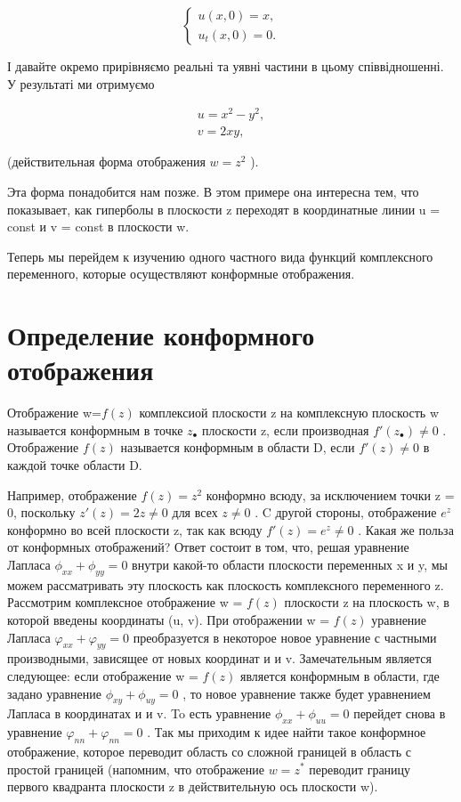 \documentclass[
  ukrainian,
]{article}
\begin{document}
\[
\begin{cases} u(x, 0) = x, \\ u_t(x, 0) = 0. \end{cases}
\]

І давайте окремо прирівняємо реальні та уявні частини в цьому
співвідношенні. У результаті ми отримуємо

\[
\begin{array}{ll} u=x^2-y^2,\\ v=2xy, \end{array}
\]

(действительная форма отображения \(w=z^2\) ).

Эта форма понадобится нам позже. В этом примере она интересна тем, что
показывает, как гиперболы в плоскости z переходят в координатные линии u
= const и v = const в плоскости w.

Теперь мы перейдем к изучению одного частного вида функций комплексного
переменного, которые осуществляют конформные отображения.

\section{Определение конформного
отображения}\label{ux43eux43fux440ux435ux434ux435ux43bux435ux43dux438ux435-ux43aux43eux43dux444ux43eux440ux43cux43dux43eux433ux43e-ux43eux442ux43eux431ux440ux430ux436ux435ux43dux438ux44f}

Отображение w=\(f(z)\) комплексиой плоскости z на комплексную плоскость
w называется конформным в точке \(z_{\bullet}\) плоскости z, если
производная \(f'(z_{\bullet}) \neq 0\) . Отображение \(f(z)\) называется
конформным в области D, если \(f'(z) \neq 0\) в каждой точке области D.

Например, отображение \(f(z) = z^2\) конформно всюду, за исключением
точки z = 0, поскольку \(z'(z) = 2z \neq 0\) для всех \(z \neq 0\) . C
другой стороны, отображение \(e^z\) конформно во всей плоскости z, так
как всюду \(f'(z) = e^z \neq 0\) . Какая же польза от конформных
отображений? Ответ состоит в том, что, решая уравнение Лапласа
\(\phi_{xx} + \phi_{yy} = 0\) внутри какой-то области плоскости
переменных x и y, мы можем рассматривать эту плоскость как плоскость
комплексного переменного z. Рассмотрим комплексное отображение w =
\(f(z)\) плоскости z на плоскость w, в которой введены координаты (u,
v). При отображении w = \(f(z)\) уравнение Лапласа
\(\varphi_{xx} + \varphi_{yy} = 0\) преобразуется в некоторое новое
уравнение с частными производными, зависящее от новых координат и и v.
Замечательным является следующее: если отображение w = \(f(z)\) является
конформным в области, где задано уравнение \(\phi_{xy} + \phi_{uy} = 0\)
, то новое уравнение также будет уравнением Лапласа в координатах и и v.
To есть уравнение \(\phi_{xx} + \phi_{uu} = 0\) перейдет снова в
уравнение \(\varphi_{nn} + \varphi_{nn} = 0\) . Так мы приходим к идее
найти такое конформное отображение, которое переводит область со сложной
границей в область с простой границей (напомним, что отображение
\(w=z^*\) переводит границу первого квадранта плоскости z в
действительную ось плоскости w).
\end{document}
